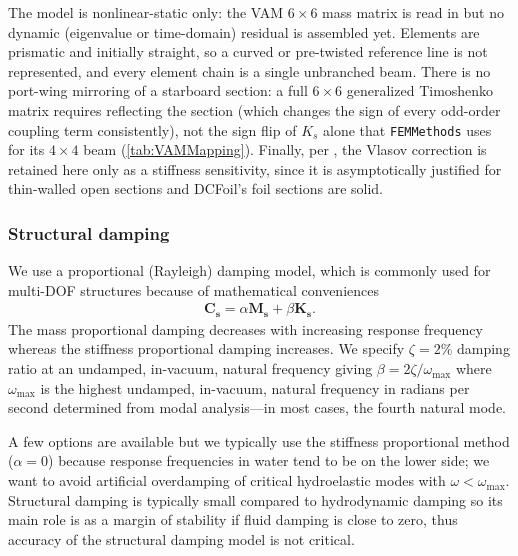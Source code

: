 \documentclass[10pt]{article}
\newcommand{\mbf}[1]{\mathbf{#1}}
\newcommand{\ben}{\begin{eqnarray*}}
\newcommand{\een}{\end{eqnarray*}}
\newcommand{\tn}[1]{\textrm{#1}}
\begin{document}
The model is nonlinear-static only: the \ac{VAM} $6\times6$ mass matrix is read in but no dynamic (eigenvalue or time-domain) residual is assembled yet.
Elements are prismatic and initially straight, so a curved or pre-twisted reference line is not represented, and every element chain is a single unbranched beam.
There is no port-wing mirroring of a starboard section: a full $6\times6$ generalized Timoshenko matrix requires reflecting the section (which changes the sign of every odd-order coupling term consistently), not the sign flip of $K_s$ alone that \texttt{FEMMethods} uses for its $4\times4$ beam (\autoref{tab:VAMMapping}).
Finally, per \citet{Yu2005b}, the Vlasov correction is retained here only as a stiffness sensitivity, since it is asymptotically justified for thin-walled open sections and DCFoil's foil sections are solid.
%
\subsubsection{Structural damping}
% 
We use a proportional (Rayleigh) damping model, which is commonly used for multi-\ac{DOF} structures because of mathematical conveniences
\ben
\mbf{C_s} = \alpha \mbf{M_s} + \beta \mbf{K_s}.
\een
The mass proportional damping decreases with increasing response frequency whereas the stiffness proportional damping increases.
We specify $\zeta = 2\%$ damping ratio at an undamped, in-vacuum, natural frequency giving
$\beta = {2 \zeta}/{\omega_{\tn{max}}}$
where $\omega_{\tn{max}}$ is the highest undamped, in-vacuum, natural frequency in radians per second determined from modal analysis---in most cases, the fourth natural mode.

A few options are available but we typically use the stiffness proportional method ($\alpha=0$) because response frequencies in water tend to be on the lower side;
we want to avoid artificial overdamping of critical hydroelastic modes with $\omega < \omega_{\tn{max}}$.
Structural damping is typically small compared to hydrodynamic damping so its main role is as a margin of stability if fluid damping is close to zero, thus accuracy of the structural damping model is not critical.
%
\end{document}
